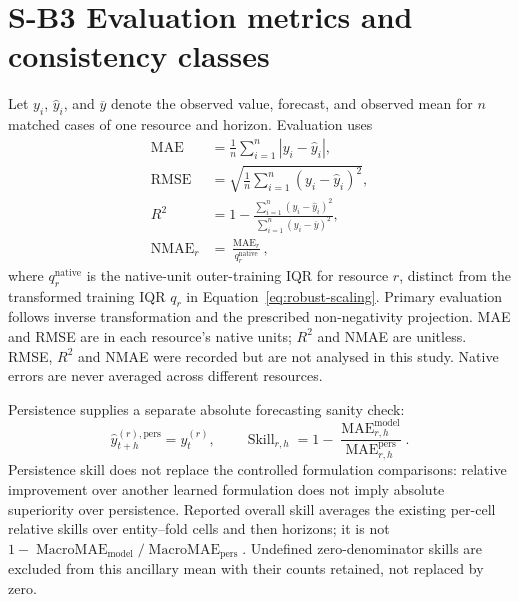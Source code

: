 \documentclass[a4paper,11pt]{article}
\begin{document}
\section*{S-B3 Evaluation metrics and consistency classes}
Let $y_i$, $\widehat{y}_i$, and $\overline{y}$ denote the observed value,
forecast, and observed mean for $n$ matched cases of one resource and horizon.
Evaluation uses
\begin{equation}
  \begin{aligned}
    \operatorname{MAE} &= \frac{1}{n}\sum_{i=1}^{n}|y_i-\widehat{y}_i|, \\
    \operatorname{RMSE} &=
      \sqrt{\frac{1}{n}\sum_{i=1}^{n}(y_i-\widehat{y}_i)^2}, \\
    R^2 &= 1-
      \frac{\sum_{i=1}^{n}(y_i-\widehat{y}_i)^2}
           {\sum_{i=1}^{n}(y_i-\overline{y})^2}, \\
    \operatorname{NMAE}_r &= \frac{\operatorname{MAE}_r}{q_r^{\mathrm{native}}},
  \end{aligned}
  \label{eq:evaluation-metrics}
\end{equation}
where $q_r^{\mathrm{native}}$ is the native-unit outer-training IQR for resource
$r$, distinct from the transformed training IQR $q_r$ in
Equation~\ref{eq:robust-scaling}. Primary evaluation follows inverse
transformation and the prescribed non-negativity projection. MAE and RMSE are
in each resource's native units; $R^2$ and NMAE are unitless. RMSE, $R^2$ and
NMAE were recorded but are not analysed in this study.  Native
errors are never averaged across different resources.

Persistence supplies a separate absolute forecasting sanity check:
\begin{equation}
  \widehat{y}_{t+h}^{(r),\mathrm{pers}}=y_t^{(r)},
  \qquad
  \operatorname{Skill}_{r,h}
  =1-\frac{\operatorname{MAE}_{r,h}^{\mathrm{model}}}
           {\operatorname{MAE}_{r,h}^{\mathrm{pers}}}.
  \label{eq:persistence-skill}
\end{equation}
Persistence skill does not replace the controlled formulation comparisons:
relative improvement over another learned formulation does not imply absolute
superiority over persistence. Reported overall skill averages the existing
per-cell relative skills over entity--fold cells and then horizons; it is not
$1-\operatorname{MacroMAE}_{\mathrm{model}}/
\operatorname{MacroMAE}_{\mathrm{pers}}$. Undefined zero-denominator skills
are excluded from this ancillary mean with their counts retained, not
replaced by zero.
\end{document}

